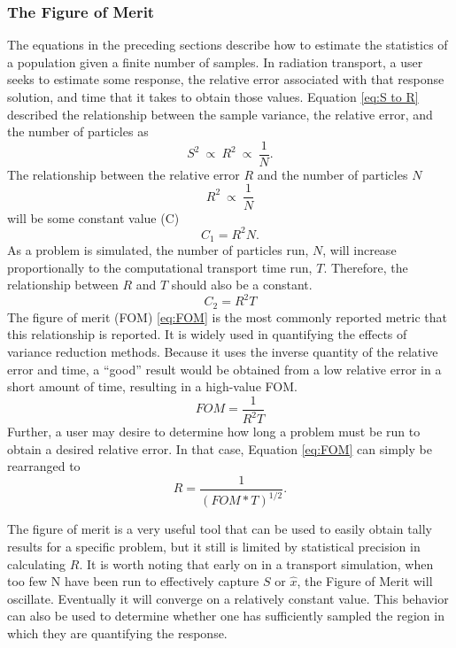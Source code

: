 \subsubsection{The Figure of Merit}
\label{subsubsec:FOM}

The equations in the preceding sections describe how to estimate the statistics
of a population given a finite number of samples. In radiation transport, a
user seeks to estimate some response, the relative error associated with that
response solution, and time that it takes to obtain those values. Equation
\eqref{eq:S to R} described the relationship between the sample variance, the
relative error, and the number of particles as
\begin{equation*}
S^2\:\propto\: R^2\:\propto\:\frac{1}{N} .
\end{equation*}
The relationship between the relative error $R$ and the number of particles $N$
\begin{equation*}
  R^2\:\propto\:\frac{1}{N}
\end{equation*}
will be some constant value (C)
\begin{equation*}
 C_1 = R^2N .
\end{equation*}
As a problem is simulated, the number of particles run, $N$, will increase
proportionally to the computational transport time run, $T$. Therefore, the
relationship between $R$ and $T$ should also be a constant.
\begin{equation*}
  C_2 = R^2T
\end{equation*}
The figure of merit (FOM) \eqref{eq:FOM}
is the most commonly reported metric that this relationship is reported. It is
widely used in quantifying the effects of variance reduction methods.
Because it uses the inverse quantity of the relative error and time, a
``good'' result would be obtained from a low relative error in a short amount of
time, resulting in a high-value FOM.
\begin{equation}
FOM=\frac { 1 }{ R^{ 2 }T }
\label{eq:FOM}
\end{equation}
Further, a user may desire to determine how long a problem must be run to obtain
a desired relative error. In that case, Equation \eqref{eq:FOM} can simply be
rearranged to
\begin{equation*}
  R = \frac{1}{(FOM*T)^{1/2}} .
\end{equation*}

The figure of merit is a very useful tool that can be used to easily obtain
tally results for a specific problem, but it still is limited by statistical
precision in calculating $R$.
It is worth noting that early on in a transport simulation,
when too few N have been run to
effectively capture $S$ or $\hat{x}$, the Figure of Merit will oscillate.
Eventually it will converge on a relatively constant value. This behavior can
also be used to determine whether one has sufficiently sampled the
region in which they are quantifying the response.

